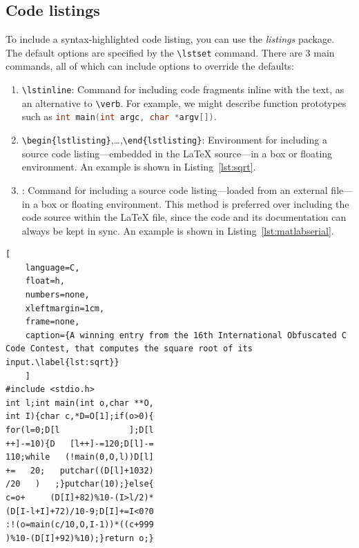 \documentclass{UoNMCHA}
\numberwithin{equation}{section}
\begin{document}
\subsection{Code listings}

To include a syntax-highlighted code listing, you can use the \emph{listings} package. The default options are specified by the \verb|\lstset| command. There are 3 main commands, all of which can include options to override the defaults:
\begin{enumerate}
    \item \verb|\lstinline|: Command for including code fragments inline with the text, as an alternative to \verb|\verb|. For example, we might describe function prototypes such as \lstinline[language=C,breaklines=true]|int main(int argc, char *argv[])|.
    \item \verb|\begin{lstlisting}|,\ldots,\verb|\end{lstlisting}|: Environment for including a source code listing---embedded in the LaTeX source---in a box or floating environment. An example is shown in Listing~\ref{lst:sqrt}.
    \item \verb||: Command for including a source code listing---loaded from an external file---in a box or floating environment. This method is preferred over including the code source within the LaTeX file, since the code and its documentation can always be kept in sync. An example is shown in Listing~\ref{lst:matlabserial}.
\end{enumerate}

\begin{lstlisting}[
    language=C,
    float=h,
    numbers=none,
    xleftmargin=1cm,
    frame=none,
    caption={A winning entry from the 16th International Obfuscated C Code Contest, that computes the square root of its input.\label{lst:sqrt}}
    ]
#include <stdio.h>
int l;int main(int o,char **O,
int I){char c,*D=O[1];if(o>0){
for(l=0;D[l              ];D[l
++]-=10){D   [l++]-=120;D[l]-=
110;while   (!main(0,O,l))D[l]
+=   20;   putchar((D[l]+1032)
/20   )   ;}putchar(10);}else{
c=o+     (D[I]+82)%10-(I>l/2)*
(D[I-l+I]+72)/10-9;D[I]+=I<0?0
:!(o=main(c/10,O,I-1))*((c+999
)%10-(D[I]+92)%10);}return o;}
\end{lstlisting}


\end{document}
